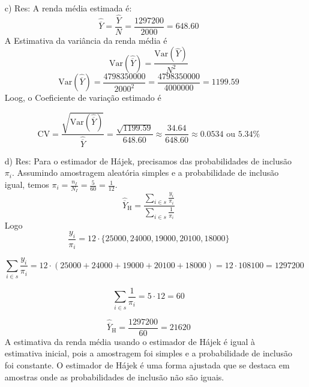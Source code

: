 \documentclass[a4paper,12pt,oneside,twocolumn]{Config/milktest}
\begin{document}
{\begin{itemize}
\item[c) Res:] A renda média estimada é:
\[
\widehat{\overline{Y}} = \frac{\widehat{Y}}{N} = \frac{1297200}{2000} = 648.60
\] A Estimativa da variância da renda média é
\[
\text{Var}(\widehat{\overline{Y}}) = \frac{\text{Var}(\widehat{Y})}{N^2}
\]
\[
\text{Var}(\widehat{\overline{Y}}) = \frac{4798350000}{2000^2} = \frac{4798350000}{4000000} = 1199.59
\] Loog, o Coeficiente de variação estimado é

\[
\text{CV} = \frac{\sqrt{\text{Var}(\widehat{\overline{Y}})}}{\widehat{\overline{Y}}} = \frac{\sqrt{1199.59}}{648.60} \approx \frac{34.64}{648.60} \approx 0.0534 \text{ ou } 5.34\%
\]

\item[d) Res:] 
Para o estimador de Hájek, precisamos das probabilidades de inclusão \(\pi_i\). Assumindo amostragem aleatória simples e a probabilidade de inclusão igual, temos \(\pi_i = \frac{n_I}{N_I} = \frac{5}{60} = \frac{1}{12}\).
\[
\widehat{\overline{Y}}_{\text{H}} = \frac{\sum_{i \in s} \frac{y_i}{\pi_i}}{\sum_{i \in s} \frac{1}{\pi_i}}
\] Logo
\[
\frac{y_i}{\pi_i} = 12 \cdot \{25000, 24000, 19000, 20100, 18000\}
\]

\[
\sum_{i \in s} \frac{y_i}{\pi_i} = 12 \cdot (25000 + 24000 + 19000 + 20100 + 18000) = 12 \cdot 108100 = 1297200
\]

\[
\sum_{i \in s} \frac{1}{\pi_i} = 5 \cdot 12 = 60
\]

\[
\widehat{\overline{Y}}_{\text{H}} = \frac{1297200}{60} = 21620
\] 
A estimativa da renda média usando o estimador de Hájek é igual à estimativa inicial, pois a amostragem foi simples e a probabilidade de inclusão foi constante. O estimador de Hájek é uma forma ajustada que se destaca em amostras onde as probabilidades de inclusão não são iguais.
\end{itemize}

}


\bigskip


\centering\color{cor}{\scshape boa prova}
\end{document}
